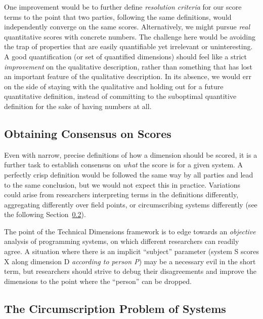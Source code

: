 \documentclass[ twoside,openright,titlepage,numbers=noenddot,headinclude,footinclude,cleardoublepage=empty,abstract=on,
                BCOR=5mm,paper=a4,fontsize=11pt
                ]{scrreprt}
\theoremstyle{definition}
\begin{document}
One improvement would be to further define \emph{resolution criteria}
for our score terms to the point that two parties, following the same
definitions, would independently converge on the same scores.
Alternatively, we might pursue \emph{real} quantitative scores with
concrete numbers. The challenge here would be avoiding the trap of
properties that are easily quantifiable yet irrelevant or uninteresting.
A good quantification (or set of quantified dimensions) should feel like
a strict \emph{improvement} on the qualitative description, rather than
something that has lost an important feature of the qualitative
description. In its absence, we would err on the side of staying with
the qualitative and holding out for a future quantitative definition,
instead of committing to the suboptimal quantitive definition for the
sake of having numbers at all.

\hypertarget{obtaining-consensus-on-scores}{\subsection{Obtaining Consensus on
Scores}\label{obtaining-consensus-on-scores}}

Even with narrow, precise definitions of how a dimension should be
scored, it is a further task to establish consensus on \emph{what} the
score is for a given system. A perfectly crisp definition would be
followed the same way by all parties and lead to the same conclusion,
but we would not expect this in practice. Variations could arise from
researchers interpreting terms in the definitions differently,
aggregating differently over field points, or circumscribing systems
differently (see the following
Section~\ref{the-circumscription-problem-of-systems}).

The point of the Technical Dimensions framework is to edge towards an
\emph{objective} analysis of programming systems, on which different
researchers can readily agree. A situation where there is an implicit
``subject'' parameter (system S scores X along dimension D
\emph{according to person P}) may be a necessary evil in the short term,
but researchers should strive to debug their disagreements and improve
the dimensions to the point where the ``person'' can be dropped.

\hypertarget{the-circumscription-problem-of-systems}{\subsection{The Circumscription Problem of
Systems}\label{the-circumscription-problem-of-systems}}
\end{document}
